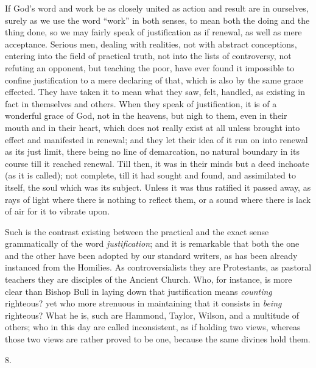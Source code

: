 If God's word and work be as closely united as action and result
are in ourselves, surely as we use the word ``work'' in both
senses, to mean both the doing and the thing done, so we may fairly
speak of justification as if renewal, as well as mere acceptance.
Serious men, dealing with realities, not with abstract conceptions,
entering into the field of practical truth, not into the lists of
controversy, not refuting an opponent, but teaching the poor, have
ever found it impossible to confine justification to a mere declaring
of that, which is also by the same grace effected. They have taken it
to mean what they saw, felt, handled, as existing in fact in
themselves and others. When they speak of justification, it is
of a wonderful grace of God, not in the heavens, but nigh to them,
even in their mouth and in their heart, which does not really exist at
all unless brought into effect and manifested in renewal; and they let
their idea of it run on into renewal as its just limit, there being no
line of demarcation, no natural boundary in its course till it reached
renewal. Till then, it was in their minds but a deed inchoate (as it
is called); not complete, till it had sought and found, and
assimilated to itself, the soul which was its subject. Unless it was
thus ratified it passed away, as rays of light where there is nothing
to reflect them, or a sound where there is lack of air for it to
vibrate upon.

Such is the contrast existing between the practical and the exact
sense grammatically of the word \emph{justification}; and it is
remarkable that both the one and the other have been adopted by our
standard writers, as has been already instanced from the Homilies. As
controversialists they are Protestants, as pastoral teachers they are
disciples of the Ancient Church. Who, for instance, is more clear than
Bishop Bull in laying down that justification means \emph{counting}
righteous? yet who more strenuous in maintaining that it consists in \emph{being}
righteous? What he is, such are Hammond, Taylor, Wilson, and a
multitude of others; who in this day are called inconsistent, as if
holding two views, whereas those two views are rather proved to be
one, because the same divines hold them.

8.

